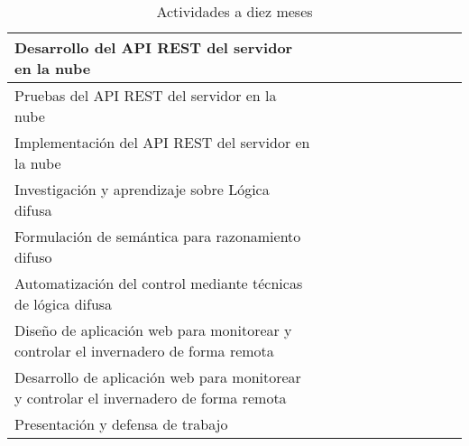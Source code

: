 \begin{table}[ht]
{\begin{tabular}{|p{8cm}|c|c|c|c|c|c|c|c|c|c|}
			\hline 
			Desarrollo del API REST del servidor en la nube&  &  &  &  & \checkmark &  &  &  &  &  \\ 
			\hline 
			Pruebas del API REST del servidor en la nube&  &  &  &  & \checkmark &  &  &  &  &  \\ 
			\hline 
			Implementación del API REST del servidor en la nube&  &  &  &  & \checkmark &  &  &  &  &  \\ 
			\hline 
			Investigación y aprendizaje sobre Lógica difusa&  &  &  & \checkmark &\checkmark  &\checkmark  &  &  &  & \\ 
			\hline 
			Formulación de semántica para razonamiento difuso&  &  &  &  &  &\checkmark  &  &  &  &  \\ 
			\hline 
			Automatización del control mediante técnicas de lógica difusa&  &  &  &  &  &  &  \checkmark & \checkmark &  &  \\ 
			\hline  
			Diseño de aplicación web para monitorear y controlar el invernadero de forma remota&  &  &  &  &  &  &  &  & \checkmark  &  \\ 
			\hline  
			Desarrollo de aplicación web para monitorear y controlar el invernadero de forma remota&  &  &  &  &  &  &  &  & \checkmark &  \\ 
			\hline  
			Presentación y defensa de trabajo&  &  &  &  &  &  &  &  &  & \checkmark  \\ 
			\hline
		\end{tabular}
	}
	\caption{Actividades a diez meses}
\end{table}